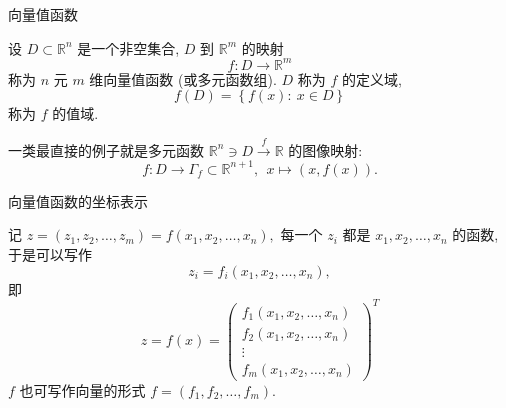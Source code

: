 
\begin{frame}{向量值函数}

\begin{Def}[向量值函数]
设 $D \subset \mathbb{R}^n$ 是一个非空集合, $D$ 到 $\mathbb{R}^m$ 的映射
\[f: D \to \mathbb{R}^m\]
称为 $n$ 元 $m$ 维向量值函数 (或多元函数组). $D$ 称为 $f$ 的定义域,
\[f(D) = \left\{ f(x): ~ x \in D \right\}\]
称为 $f$ 的值域.
\end{Def}

\pause
\vspace{1em}

一类最直接的例子就是多元函数 $\mathbb{R}^n \ni D \xrightarrow{f} \mathbb{R}$ 的图像映射:
\[f: D \to \Gamma_f \subset \mathbb{R}^{n+1}, ~~ x \mapsto (x, f(x)).\]

\end{frame}


\begin{frame}{向量值函数的坐标表示}

记 $z = (z_1, z_2, \dots, z_m) = f(x_1, x_2, \dots, x_n),$ 每一个 $z_i$ 都是 $x_1, x_2, \dots, x_n$ 的函数, 于是可以写作
\[z_i = f_i(x_1, x_2, \dots, x_n),\]
即
\[z = f(x) = \begin{pmatrix}
f_1(x_1, x_2, \dots, x_n) \\
f_2(x_1, x_2, \dots, x_n) \\
\vdots \\
f_m(x_1, x_2, \dots, x_n)
\end{pmatrix}^T
\]
$f$ 也可写作向量的形式 $f = (f_1, f_2, \dots, f_m).$

\end{frame}


